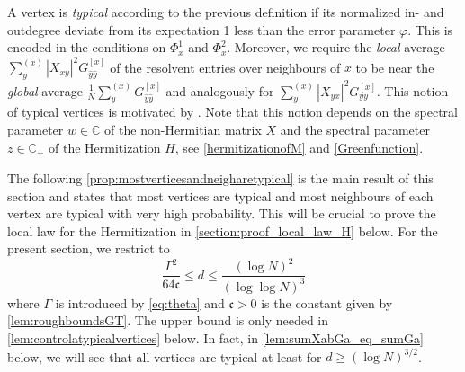 \documentclass[10pt,a4paper]{amsart}
\newcommand{\abs}[1]{\left| #1 \right|}
\newcommand{\C}{\mathbb{C}}
\newcommand{\ccc}{\mathfrak{c}}
\numberwithin{equation}{section}
\newcommand*\ubarr[1]{{\widehat{#1}}}
\newcommand{\nc}{\normalcolor}
\begin{document}
A vertex is \emph{typical} according to the previous definition if its normalized in- and outdegree deviate from its expectation 1 less than the error parameter $\varphi$. This is encoded in the conditions on $\Phi^1_x$ and $\Phi^2_x$. Moreover, we require the \emph{local} average $\sum_{y}^{(x)} \abs{X_{xy}}^2 G_{\ubarr{y}\ubarr{y}}^{[x]}$ of the resolvent entries over neighbours of $x$ 
to be near the \emph{global} average $\frac{1}{N}\sum_{y}^{(x)} G_{\ubarr{y}\ubarr{y}}^{[x]}$ and analogously for $\sum_{y}^{(x)} \abs{X_{yx}}^2 G_{yy}^{[x]}$. 
This notion of typical vertices is motivated by \cite[Definition~4.6]{alt2021delocalization}. Note that this notion depends on the spectral parameter $w \in \C$ of the non-Hermitian matrix $X$ and the spectral parameter $z \in \C_+$ of the Hermitization $H$, see \cref{hermitizationofM} and \cref{Greenfunction}.  

The following \cref{prop:mostverticesandneigharetypical} is the main result of this section 
and states that most vertices are typical and most neighbours of each vertex are typical with very high probability. This will be crucial to prove the local law for the Hermitization in \cref{section:proof_local_law_H} below. 
For the present section, we restrict to 
\begin{equation}\label{eq:regimedlog2}
 \frac{\Gamma^2}{64 \mathfrak c} \leq  d \le \frac{(\log N)^2}{(\log \log N)^3 }
\end{equation}
where $\Gamma$ is introduced by \eqref{eq:theta} and $\ccc>0$ is the constant given by \cref{lem:roughboundsGT}. The upper bound is only needed in \cref{lem:controlatypicalvertices} below. 
In fact, in \cref{lem:sumXabGa_eq_sumGa} below, we will see that all vertices are typical at least for $d \geq (\log N)^{3/2}$. 

\nc 
\end{document}
